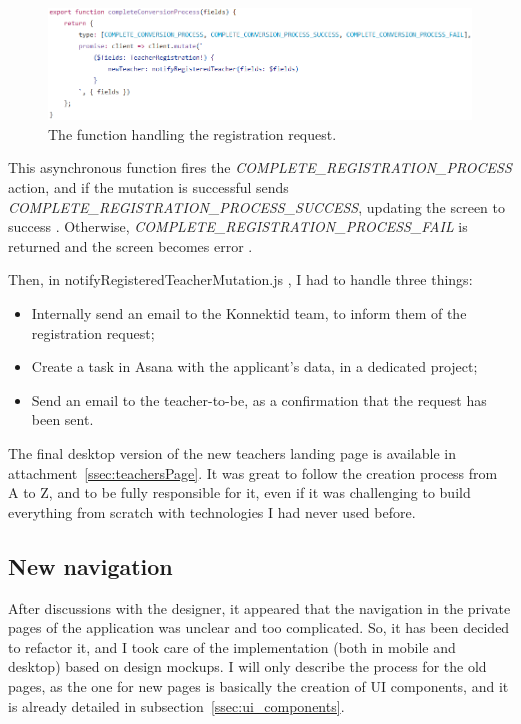  \begin{figure}[H]
    \centering
    \includegraphics[scale=0.8]{figure/completeRegistration.png}
    \caption{The function handling the registration request.}
    \label{fig:completeRegistration}
\end{figure}

This asynchronous function fires the \textit{COMPLETE\_REGISTRATION\_PROCESS} action, and if the mutation is successful sends \textit{COMPLETE\_REGISTRATION\_PROCESS\_SUCCESS}, updating the screen to \guillemotleft{} success \guillemotright{}. Otherwise, \textit{COMPLETE\_REGISTRATION\_PROCESS\_FAIL} is returned and the screen becomes \guillemotleft{} error \guillemotright{}.

Then, in \guillemotleft{} notifyRegisteredTeacherMutation.js \guillemotright{}, I had to handle three things: 
\begin{itemize}[noitemsep]
    \item Internally send an email to the Konnektid team, to inform them of the registration request;
    \item Create a task in Asana with the applicant's data, in a dedicated project;
    \item Send an email to the teacher-to-be, as a confirmation that the request has been sent.
\end{itemize}

The final desktop version of the new teachers landing page is available in {\sc attachment}~\ref{ssec:teachersPage}. It was great to follow the creation process from A to Z, and to be fully responsible for it, even if it was challenging to build everything from scratch with technologies I had never used before.

\subsection{New navigation}
\label{ssec:new_nav}

After discussions with the designer, it appeared that the navigation in the private pages of the application was unclear and too complicated. So, it has been decided to refactor it, and I took care of the implementation (both in mobile and desktop) based on design mockups. I will only describe the process for the old pages, as the one for new pages is basically the creation of UI components, and it is already detailed in {\sc subsection}~\ref{ssec:ui_components}.

